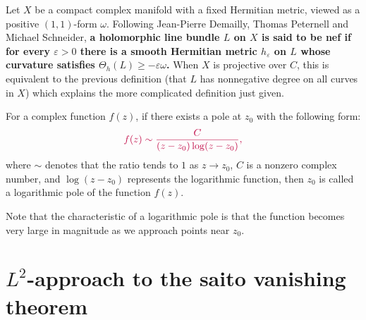 \documentclass[lang=en,12pt]{beautybook}
\begin{document}
\begin{definition}
Let $X$ be a compact complex manifold with a fixed Hermitian metric, viewed as a positive $(1,1)$-form $\omega$. Following Jean-Pierre Demailly, Thomas Peternell and Michael Schneider, \textbf{\color{purple} a holomorphic line bundle $L$ on $X$ is said to be nef if for every $\varepsilon>0$ there is a smooth Hermitian metric $h_\varepsilon$ on $L$ whose curvature satisfies $\Theta_h(L) \geqslant-\varepsilon \omega$.} When $X$ is projective over $C$, this is equivalent to the previous definition (that $L$ has nonnegative degree on all curves in $X$) which explains the more complicated definition just given. 
\end{definition}
    \begin{definition}
        For a complex function $f(z)$, if there exists a pole at $z_0$ with the following form:
        \[\color{purple} f(z)\sim \frac{C}{(z-z_0)\log (z-z_0)},\]
        where $\sim$ denotes that the ratio tends to $1$ as $z\to z_0$, $C$ is a nonzero complex number, and $\log(z-z_0)$ represents the logarithmic function, then $z_0$ is called a logarithmic pole of the function $f(z)$.

        Note that the characteristic of a logarithmic pole is that the function becomes very large in magnitude as we approach points near $z_0$.
    \end{definition}

\chapter{\texorpdfstring{$L^2$}{}-approach to the saito vanishing theorem}
\end{document}
